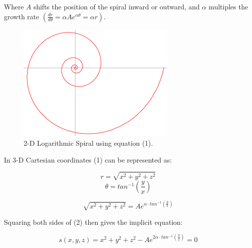 \documentclass[a4paper]{article}
\begin{document}
Where $A$ shifts the position of the spiral inward or outward, and $\alpha$ multiples the growth rate $(\frac{dr}{d\theta} = \alpha A e^{\alpha \theta} = \alpha r)$.

\begin{figure}[h]
	\centering\includegraphics[scale=0.7]{./img/logarithmic-spiral.png}
	\caption{2-D Logarithmic Spiral using equation (1). \cite{logspiral}}
	\label{fig:log-spiral} %
\end{figure}

\pagebreak

In 3-D Cartesian coordinates (1) can be represented as:

$$ r = \sqrt{x^2 + y^2 + z^2 } $$
$$ \theta = tan^{-1}({\frac{y}{x}}) $$

\begin{equation}
	\sqrt{x^2 + y^2 + z^2 } = A e^{\alpha \cdot tan^{-1}({\frac{y}{x}})}
\end{equation}

Squaring both sides of (2) then gives the implicit equation:

\begin{equation}
	s(x,y,z) = x^2 + y^2 + z^2 - A e^{2 \alpha \cdot tan^{-1}({\frac{y}{x}})} = 0
\end{equation}
\end{document}
